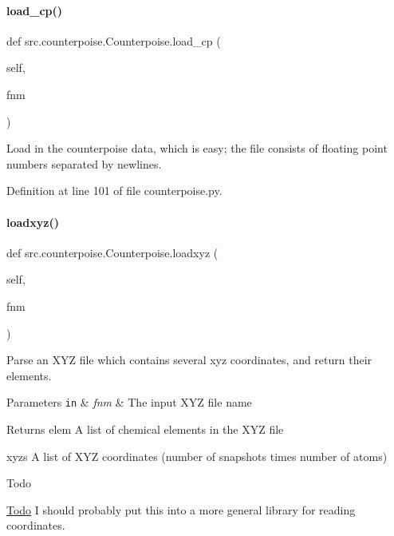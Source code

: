 \paragraph{\texorpdfstring{load\+\_\+cp()}{load\_cp()}}
{\footnotesize\ttfamily def src.\+counterpoise.\+Counterpoise.\+load\+\_\+cp (\begin{DoxyParamCaption}\item[{}]{self,  }\item[{}]{fnm }\end{DoxyParamCaption})}



Load in the counterpoise data, which is easy; the file consists of floating point numbers separated by newlines. 



Definition at line 101 of file counterpoise.\+py.

\mbox{\label{classsrc_1_1counterpoise_1_1Counterpoise_abe282b072c0d1c5b5a3e2438ffc911c4}} 
\paragraph{\texorpdfstring{loadxyz()}{loadxyz()}}
{\footnotesize\ttfamily def src.\+counterpoise.\+Counterpoise.\+loadxyz (\begin{DoxyParamCaption}\item[{}]{self,  }\item[{}]{fnm }\end{DoxyParamCaption})}



Parse an X\+YZ file which contains several xyz coordinates, and return their elements. 


\begin{DoxyParams}[1]{Parameters}
\mbox{\tt in}  & {\em fnm} & The input X\+YZ file name \\
\hline
\end{DoxyParams}
\begin{DoxyReturn}{Returns}
elem A list of chemical elements in the X\+YZ file 

xyzs A list of X\+YZ coordinates (number of snapshots times number of atoms) 
\end{DoxyReturn}
\begin{DoxyRefDesc}{Todo}
\item[\hyperlink{todo__todo000003}{Todo}]I should probably put this into a more general library for reading coordinates. \end{DoxyRefDesc}


